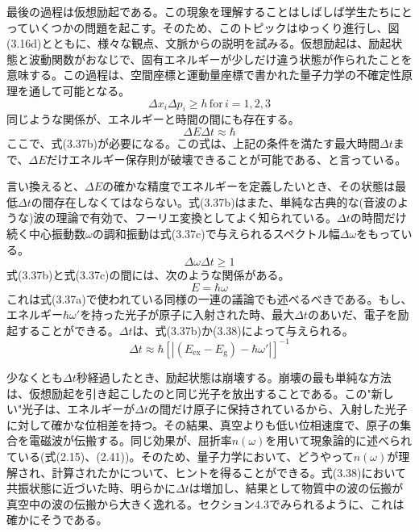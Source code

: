 \documentclass[11pt,a4j,uplatex]{jsarticle}
\begin{document}
最後の過程は仮想励起である。この現象を理解することはしばしば学生たちにとっていくつかの問題を起こす。そのため、このトピックはゆっくり進行し、図(3.16d)とともに、様々な観点、文脈からの説明を試みる。仮想励起は、励起状態と波動関数がおなじで、固有エネルギーが少しだけ違う状態が作られたことを意味する。この過程は、空間座標と運動量座標で書かれた量子力学の不確定性原理を通して可能となる。
\begin{equation}
  \Delta x_i\Delta p_i\geq h\,\mathrm{for}\,i=1,2,3\tag{3.37a}
\end{equation}
同じような関係が、エネルギーと時間の間にも存在する。
\begin{equation}
  \Delta E\Delta t\approx\hbar\tag{3.37b}
\end{equation}
ここで、式(3.37b)が必要になる。この式は、上記の条件を満たす最大時間$\Delta t$まで、$\Delta E$だけエネルギー保存則が破壊できることが可能である、と言っている。%

言い換えると、$\Delta E$の確かな精度でエネルギーを定義したいとき、その状態は最低$\Delta t$の間存在しなくてはならない。式(3.37b)はまた、単純な古典的な(音波のような)波の理論で有効で、フーリエ変換としてよく知られている。$\Delta t$の時間だけ続く中心振動数$\omega$の調和振動は式(3.37c)で与えられるスペクトル幅$\Delta \omega$をもっている。
\begin{equation}
  \Delta\omega\Delta t\geq1\tag{3.37c}
\end{equation}
式(3.37b)と式(3.37c)の間には、次のような関係がある。
\begin{equation}
  E=\hbar\omega\tag{3.37d}
\end{equation}
これは式(3.37a)で使われている同様の一連の議論でも述べるべきである。もし、エネルギー$\hbar\omega'$を持った光子が原子に入射された時、最大$\Delta t$のあいだ、電子を励起することができる。$\Delta t$は、式(3.37b)か(3.38)によって与えられる。
\begin{equation}
  \Delta t\approx\hbar[\left|(E_{\mathrm{ex}}-E_{\mathrm{g}})-\hbar\omega'\right|]^{-1}\tag{3.38}
\end{equation}

少なくとも$\Delta t$秒経過したとき、励起状態は崩壊する。崩壊の最も単純な方法は、仮想励起を引き起こしたのと同じ光子を放出することである。この"新しい"光子は、エネルギーが$\Delta t$の間だけ原子に保持されているから、入射した光子に対して確かな位相差を持つ。その結果、真空よりも低い位相速度で、原子の集合を電磁波が伝搬する。同じ効果が、屈折率$n(\omega)$を用いて現象論的に述べられている(式(2.15)、(2.41))。そのため、量子力学において、どうやって$n(\omega)$が理解され、計算されたかについて、ヒントを得ることができる。式(3.38)において共振状態に近づいた時、明らかに$\Delta t$は増加し、結果として物質中の波の伝搬が真空中の波の伝搬から大きく逸れる。セクション4.3でみられるように、これは確かにそうである。
\end{document}
